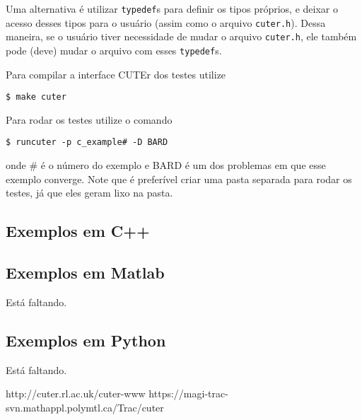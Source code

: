 \documentclass[letterpaper,11pt]{article}
\numberwithin{equation}{section}
\begin{document}
Uma alternativa é utilizar \verb+typedef+s para definir os tipos próprios, e deixar o
acesso desses tipos para o usuário (assim como o arquivo \verb+cuter.h+). Dessa maneira,
se o usuário tiver necessidade de mudar o arquivo \verb+cuter.h+, ele também pode (deve)
mudar o arquivo com esses \verb+typedef+s.

Para compilar a interface CUTEr dos testes utilize
\begin{verbatim}
$ make cuter
\end{verbatim}
Para rodar os testes utilize o comando
\begin{verbatim}
$ runcuter -p c_example# -D BARD
\end{verbatim}
onde \# é o número do exemplo e BARD é um dos problemas em que esse exemplo converge. Note
que é preferível criar uma pasta separada para rodar os testes, já que eles geram lixo na
pasta.

\subsection{Exemplos em C++}

\subsection{Exemplos em Matlab}

Está faltando.

\subsection{Exemplos em Python}

Está faltando.

\begin{thebibliography}{3}
 http://cuter.rl.ac.uk/cuter-www 
 https://magi-trac-svn.mathappl.polymtl.ca/Trac/cuter 
\end{thebibliography}
\end{document}
